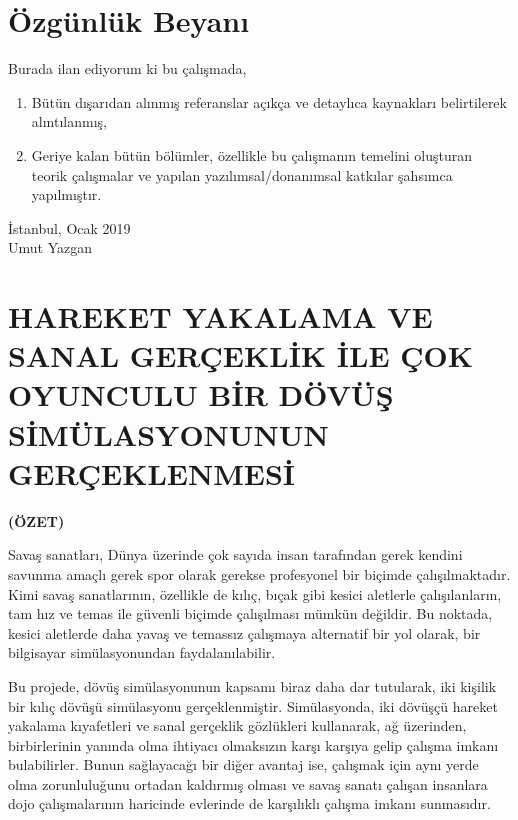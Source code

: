 \documentclass[a4paper, 12pt, titlepage]{article}
\newcommand{\theturkishtitle}{HAREKET YAKALAMA VE SANAL GERÇEKLİK İLE ÇOK OYUNCULU BİR DÖVÜŞ
                              SİMÜLASYONUNUN GERÇEKLENMESİ}
\newcommand{\theauthor}{Umut Yazgan}
\newcommand{\theturkishdate}{Ocak 2019}
\begin{document}
\newpage
\section*{Özgünlük Beyanı}
Burada ilan ediyorum ki bu çalışmada,
\begin{enumerate}
    \item Bütün dışarıdan alınmış referanslar açıkça ve detaylıca kaynakları belirtilerek
          alıntılanmış,
    \item Geriye kalan bütün bölümler, özellikle bu çalışmanın temelini oluşturan teorik çalışmalar
          ve yapılan yazılımsal/donanımsal katkılar şahsımca yapılmıştır.

\end{enumerate}
\vspace{1em}
İstanbul, \theturkishdate
\vspace{3em}\\ \theauthor


\newpage
\section*{\centering\theturkishtitle}
\centerline{\fontsize{16pt}{21.6pt}\sffamily\bfseries (ÖZET)}
Savaş sanatları, Dünya üzerinde çok sayıda insan tarafından gerek kendini savunma amaçlı gerek spor
olarak gerekse profesyonel bir biçimde çalışılmaktadır. Kimi savaş sanatlarının, özellikle de
kılıç, bıçak gibi kesici aletlerle çalışılanların, tam hız ve temas ile güvenli biçimde çalışılması
mümkün değildir. Bu noktada, kesici aletlerde daha yavaş ve temassız çalışmaya alternatif bir yol
olarak, bir bilgisayar simülasyonundan faydalanılabilir.

Bu projede, dövüş simülasyonunun kapsamı biraz daha dar tutularak, iki kişilik bir kılıç dövüşü
simülasyonu gerçeklenmiştir. Simülasyonda, iki dövüşçü hareket yakalama kıyafetleri ve sanal
gerçeklik gözlükleri kullanarak, ağ üzerinden, birbirlerinin yanında olma ihtiyacı olmaksızın karşı
karşıya gelip çalışma imkanı bulabilirler. Bunun sağlayacağı bir diğer avantaj ise, çalışmak için
aynı yerde olma zorunluluğunu ortadan kaldırmış olması ve savaş sanatı çalışan insanlara dojo
çalışmalarının haricinde evlerinde de karşılıklı çalışma imkanı sunmasıdır.
\end{document}
